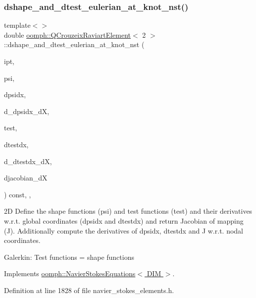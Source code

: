 \subsubsection{\texorpdfstring{dshape\+\_\+and\+\_\+dtest\+\_\+eulerian\+\_\+at\+\_\+knot\+\_\+nst()}{dshape\_and\_dtest\_eulerian\_at\_knot\_nst()}\hspace{0.1cm}{\footnotesize\ttfamily [3/4]}}
{\footnotesize\ttfamily template$<$$>$ \\
double \hyperlink{classoomph_1_1QCrouzeixRaviartElement}{oomph\+::\+Q\+Crouzeix\+Raviart\+Element}$<$ 2 $>$\+::dshape\+\_\+and\+\_\+dtest\+\_\+eulerian\+\_\+at\+\_\+knot\+\_\+nst (\begin{DoxyParamCaption}\item[{const unsigned \&}]{ipt,  }\item[{\hyperlink{classoomph_1_1Shape}{Shape} \&}]{psi,  }\item[{\hyperlink{classoomph_1_1DShape}{D\+Shape} \&}]{dpsidx,  }\item[{\hyperlink{classoomph_1_1RankFourTensor}{Rank\+Four\+Tensor}$<$ double $>$ \&}]{d\+\_\+dpsidx\+\_\+dX,  }\item[{\hyperlink{classoomph_1_1Shape}{Shape} \&}]{test,  }\item[{\hyperlink{classoomph_1_1DShape}{D\+Shape} \&}]{dtestdx,  }\item[{\hyperlink{classoomph_1_1RankFourTensor}{Rank\+Four\+Tensor}$<$ double $>$ \&}]{d\+\_\+dtestdx\+\_\+dX,  }\item[{\hyperlink{classoomph_1_1DenseMatrix}{Dense\+Matrix}$<$ double $>$ \&}]{djacobian\+\_\+dX }\end{DoxyParamCaption}) const\hspace{0.3cm}{\ttfamily [inline]}, {\ttfamily [protected]}, {\ttfamily [virtual]}}

2D Define the shape functions (psi) and test functions (test) and their derivatives w.\+r.\+t. global coordinates (dpsidx and dtestdx) and return Jacobian of mapping (J). Additionally compute the derivatives of dpsidx, dtestdx and J w.\+r.\+t. nodal coordinates.

Galerkin\+: Test functions = shape functions 

Implements \hyperlink{classoomph_1_1NavierStokesEquations_afbc63afd804f5143c74b0ca1be76ef82}{oomph\+::\+Navier\+Stokes\+Equations$<$ D\+I\+M $>$}.



Definition at line 1828 of file navier\+\_\+stokes\+\_\+elements.\+h.



